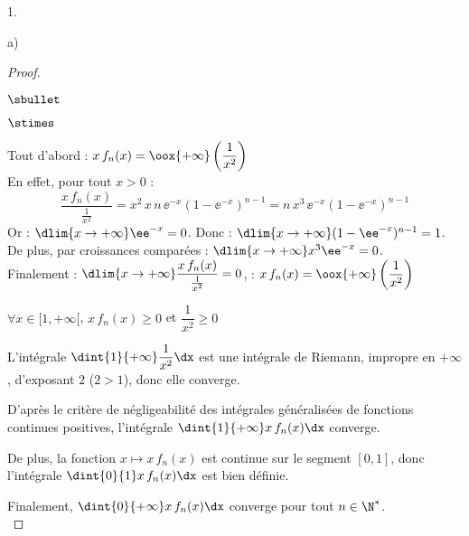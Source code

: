 \documentclass[11pt]{article}%
\begin{document}
\begin{noliste}{1.}
\begin{noliste}{a)}
\begin{proof}
\begin{noliste}{$\sbullet$}
                
      \item 
        \begin{noliste}{$\stimes$}
        \item Tout d'abord : $x \, f_n(x) = \oox{+\infty} \left( \dfrac{1}{x^2}
          \right)$\\[.2cm]
          En effet, pour tout $x>0$ :
          \[
          \dfrac{x \, f_n(x)}{\frac{1}{x^2}} = x^2 \, x \, n \, 
          \ee^{-x}(1-\ee^{-x})^{n-1} = n \, x^3 \, \ee^{-x}(1-\ee^{-x})^{n-1}
          \]
          Or : $\dlim{x\to+\infty} \ee^{-x}=0$. Donc : $\dlim{x\to+\infty}
          (1-\ee^{-x})^{n-1} = 1$.\\[.2cm]
          De plus, par croissances comparées : $\dlim{x\to +\infty} x^3 
          \ee^{-x}=0$.\\
          Finalement : $\dlim{x\to+\infty} \dfrac{x \, f_n(x)}{\frac{1}{x^2}} 
          = 0$, \ie : $x \, f_n(x) = \oox{+\infty} 
          \left(\dfrac{1}{x^2}\right)$
          
        \item $\forall x \in [1,+\infty[$, $x\, f_n(x) \geq 0$ et 
          $\dfrac{1}{x^2} \geq 0$
          
        \item L'intégrale $\dint{1}{+\infty} \dfrac{1}{x^2} \dx$ est une 
          intégrale de Riemann, impropre en $+\infty$, d'exposant $2$ 
          ($2>1$), donc elle converge.
        \end{noliste}
        D'après le critère de négligeabilité des intégrales généralisées de 
        fonctions continues positives, l'intégrale $\dint{1}{+\infty}
        x\, f_n(x) \dx$ converge.
        
      \item De plus, la fonction $x\mapsto x \, f_n(x)$ est continue
        sur le segment $[0,1]$, donc l'intégrale $\dint{0}{1} x\,
        f_n(x) \dx$ est bien définie.
      \end{noliste}
      Finalement, $\dint{0}{+\infty} x\, f_n(x) \dx$ converge pour tout 
      $n\in\N^*$. %
      ~\\[-1cm]
    \end{proof}
  
  
  \newpage
  


\end{noliste}
\end{noliste}
\end{document}
